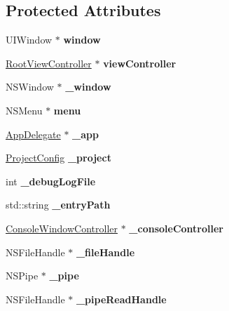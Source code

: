\subsection*{Protected Attributes}
\begin{DoxyCompactItemize}
\item 
\mbox{\label{interfaceAppController_a4b2762c205bc9701ffb112041e2eaad8}} 
U\+I\+Window $\ast$ {\bfseries window}
\item 
\mbox{\label{interfaceAppController_aa4ca3561d4f1c76f39f496ae3f8f8def}} 
\hyperlink{interfaceRootViewController}{Root\+View\+Controller} $\ast$ {\bfseries view\+Controller}
\item 
\mbox{\label{interfaceAppController_a3a6619b8b6069f3c3025eb7559185588}} 
N\+S\+Window $\ast$ {\bfseries \+\_\+window}
\item 
\mbox{\label{interfaceAppController_a9b73bc4a7652a0b4fe6136152acfabb8}} 
N\+S\+Menu $\ast$ {\bfseries menu}
\item 
\mbox{\label{interfaceAppController_a3336f2db309f5d1976c5af0dbfa993e9}} 
\hyperlink{classAppDelegate}{App\+Delegate} $\ast$ {\bfseries \+\_\+app}
\item 
\mbox{\label{interfaceAppController_af2b535eeb54942d52aceb667b60863cd}} 
\hyperlink{classProjectConfig}{Project\+Config} {\bfseries \+\_\+project}
\item 
\mbox{\label{interfaceAppController_ae6c6b0701e57edd39caecb4e1ae28221}} 
int {\bfseries \+\_\+debug\+Log\+File}
\item 
\mbox{\label{interfaceAppController_aeb289258aefa52a37d1dc7d0f135d01a}} 
std\+::string {\bfseries \+\_\+entry\+Path}
\item 
\mbox{\label{interfaceAppController_a65faddb451eea2f17d6b3dafd030dd39}} 
\hyperlink{interfaceConsoleWindowController}{Console\+Window\+Controller} $\ast$ {\bfseries \+\_\+console\+Controller}
\item 
\mbox{\label{interfaceAppController_a5052d87d90a31974560ae6da076af53f}} 
N\+S\+File\+Handle $\ast$ {\bfseries \+\_\+file\+Handle}
\item 
\mbox{\label{interfaceAppController_a9193b81f615d64a5d971c6b40d7e08ea}} 
N\+S\+Pipe $\ast$ {\bfseries \+\_\+pipe}
\item 
\mbox{\label{interfaceAppController_ae956d07f1ead140478e5236ff839c600}} 
N\+S\+File\+Handle $\ast$ {\bfseries \+\_\+pipe\+Read\+Handle}
\end{DoxyCompactItemize}
